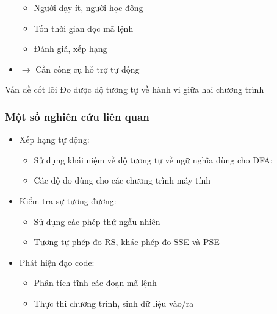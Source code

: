 \documentclass{beamer}
\begin{document}
\begin{frame}
\begin{minipage}{0.59\linewidth}
\begin{itemize}
      \begin{itemize}
      \item Người dạy ít, người học đông
      \item Tốn thời gian đọc mã lệnh
      \item Đánh giá, xếp hạng
      \end{itemize} \pause
    \item $\rightarrow$ Cần công cụ hỗ trợ tự động
    \end{itemize} \pause
  \end{minipage}
  \begin{block}{Vấn đề cốt lõi}
    Đo được độ tương tự về hành vi giữa hai chương trình
  \end{block}
\end{frame}

\begin{frame}
  \frametitle{Một số nghiên cứu liên quan}
  \begin{itemize}
  \item Xếp hạng tự động: \cite{alur2013automated}
    \begin{itemize}
    \item Sử dụng khái niệm về độ tương tự về
      ngữ nghĩa dùng cho DFA; 
	\item Các độ đo dùng cho các chương trình máy tính
    \end{itemize}
  \item Kiểm tra sự tương đương: \cite{jiang2009automatic}
    \begin{itemize}
    \item Sử dụng các phép thử ngẫu nhiên
    \item Tương tự phép đo RS, khác phép đo SSE và PSE
    \end{itemize}
  \item Phát hiện đạo code: \cite{komondoor2001using}
    \begin{itemize}
    \item Phân tích tĩnh các đoạn mã lệnh
	\item Thực thi chương trình, sinh dữ liệu vào/ra
    \end{itemize}
  \end{itemize}

\end{frame}
\end{document}
